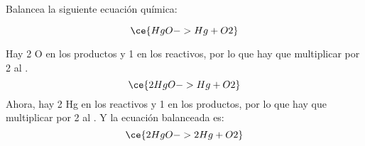 Balancea la siguiente ecuación química:

\[
    \ce{HgO -> Hg + O2}
\]

\begin{solutionbox}{5cm}
    Hay 2 O en los productos y 1 en los reactivos, por lo que hay que multiplicar por 2 al .
    \[
        \ce{2HgO -> Hg + O2}
    \]
    Ahora, hay 2 Hg en los reactivos y 1 en los productos, por lo que hay que multiplicar por 2 al . Y la ecuación balanceada es:
    \[
        \ce{2HgO -> 2Hg + O2}
    \]
\end{solutionbox}